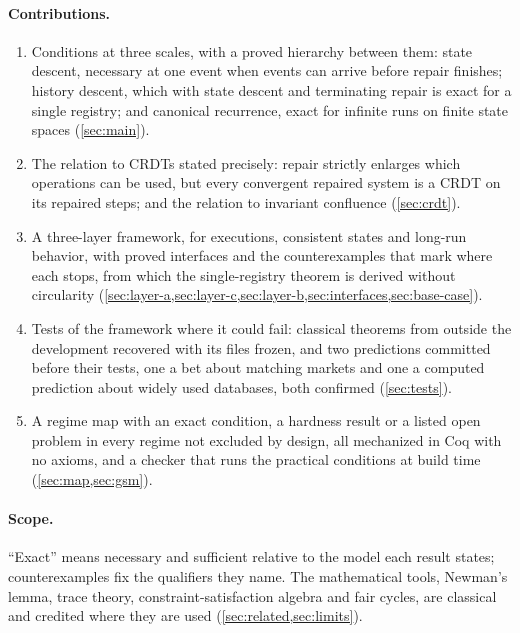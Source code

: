 \paragraph{Contributions.}
\begin{enumerate}[nosep]
  \item Conditions at three scales, with a proved hierarchy between them: state descent, necessary at
    one event when events can arrive before repair finishes; history descent, which with state descent and terminating repair is exact for a single
    registry; and canonical recurrence, exact for infinite runs on finite state spaces
    (\cref{sec:main}).
  \item The relation to CRDTs stated precisely: repair strictly enlarges which operations can be used, but
    every convergent repaired system is a CRDT on its repaired steps; and the relation to invariant
    confluence (\cref{sec:crdt}).
  \item A three-layer framework, for executions, consistent states and long-run behavior, with proved
    interfaces and the counterexamples that mark where each stops, from which the single-registry theorem
    is derived without circularity (\cref{sec:layer-a,sec:layer-c,sec:layer-b,sec:interfaces,sec:base-case}).
  \item Tests of the framework where it could fail: classical theorems from outside the development
    recovered with its files frozen, and two predictions committed before their tests, one a bet about
    matching markets and one a computed prediction about widely used databases, both confirmed
    (\cref{sec:tests}).
  \item A regime map with an exact condition, a hardness result or a listed open problem in every regime
    not excluded by design,
    all mechanized in Coq with no axioms, and a checker that runs the practical conditions at build
    time (\cref{sec:map,sec:gsm}).
\end{enumerate}

\paragraph{Scope.} ``Exact'' means necessary and sufficient relative to the model each result states;
counterexamples fix the qualifiers they name. The mathematical tools, Newman's lemma, trace theory,
constraint-satisfaction algebra and fair cycles, are classical and credited where they are used
(\cref{sec:related,sec:limits}).
